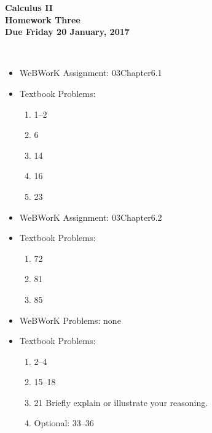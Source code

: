 \documentclass[12pt]{article}
\begin{document}
\pagestyle{empty}
 
\begin{center}
{\large {\bf Calculus II}}\\
\medskip
{\large {\bf Homework Three}}\\
\medskip
{ {\bf Due Friday 20 January, 2017}}\\
\end{center}

 \\ 



\begin{itemize}

\item WeBWorK Assignment: 03Chapter6.1

\item Textbook Problems:
  \begin{enumerate}
  \setlength{\itemsep}{-1mm}
    \item 1--2
    \item 6
    \item 14
    \item 16
    \item 23
  \end{enumerate}

\end{itemize}


\begin{itemize}
  \item WeBWorK Assignment: 03Chapter6.2
  \item Textbook Problems:
    \begin{enumerate}
    \setlength{\itemsep}{-1mm}
    \item 72
    \item 81
    \item 85
\end{enumerate}
\end{itemize}




\begin{itemize}
  \item WeBWorK Problems: none
  \item Textbook Problems:
\begin{enumerate}
\setlength{\itemsep}{-1mm}
  \item 2--4
  \item 15--18
  \item 21 Briefly explain or illustrate your reasoning.
  \item Optional: 33--36
\end{enumerate}
\end{itemize}







\end{document}
